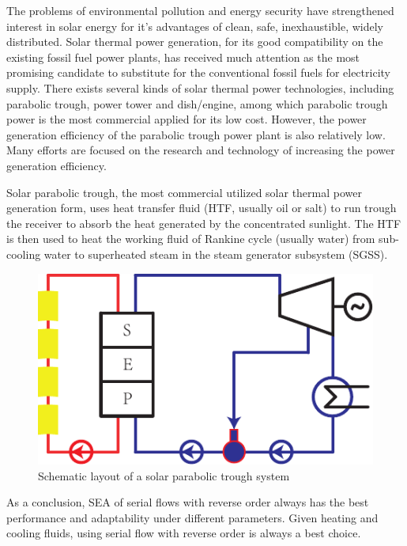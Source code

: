 \documentclass{article}
\begin{document}
The problems of environmental pollution and energy security have strengthened interest in solar energy for it's advantages of clean, safe, inexhaustible, widely distributed. Solar thermal power generation, for its good compatibility on the existing fossil fuel power plants, has received much attention as the most promising candidate to substitute for the conventional fossil fuels for electricity supply. There exists several kinds of solar thermal power technologies, including parabolic trough, power tower and dish/engine, among which parabolic trough power is the most commercial applied for its low cost. However, the power generation efficiency of the parabolic trough power plant is also relatively low. Many efforts are focused on the research and technology of increasing the power generation efficiency.

Solar parabolic trough, the most commercial utilized solar thermal power generation form, uses heat transfer fluid (HTF, usually oil or salt) to run trough the receiver to absorb the heat generated by the concentrated sunlight. The HTF is then used to heat the working fluid of Rankine cycle (usually water) from sub-cooling water to superheated steam in the steam generator subsystem (SGSS).


\begin{figure}[htbp]
\begin{center}
	\includegraphics[width = 0.7\columnwidth]{fig/SPTS}
	\caption{Schematic layout of a solar parabolic trough system}
	\label{fig:spts}
\end{center}
\end{figure}

As a conclusion, SEA of serial flows with reverse order always has the best performance and adaptability under different parameters. Given heating and cooling fluids, using serial flow with reverse order is always a best choice.



\clearpage
\printnomenclature[2.5cm]{}
\clearpage



\end{document}
